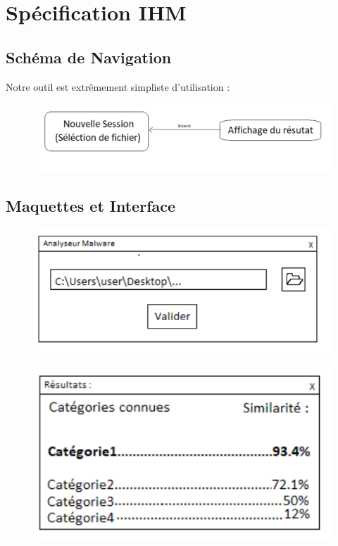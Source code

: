 \documentclass[a4paper, 12pt, twoside]{article}
\begin{document}
\section{Spécification IHM}
\subsection{Schéma de Navigation}

Notre outil est extrêmement simpliste d'utilisation  :
\begin{figure}[!h]
\centering
\includegraphics[scale=0.75]{utilisation.pdf}
\caption{}
\end{figure}






\newpage
\subsection{Maquettes et Interface}
\begin{figure}[!h]
\centering
\includegraphics{maquette1.pdf}
\caption{}
\end{figure}
\begin{figure}[!h]
\centering
\includegraphics{maquette2.pdf}
\caption{}
\end{figure}
\end{document}
